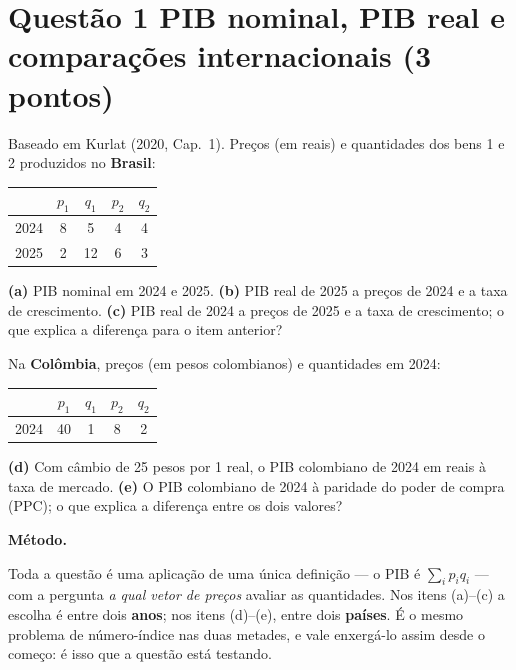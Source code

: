 \documentclass[11pt, a4paper]{article}
\newcommand{\passo}[1]{\medskip\noindent\textbf{#1}\par\nobreak}
\begin{document}
\section[Questão 1 --- PIB nominal, PIB real e comparações internacionais]{Questão 1 \quad PIB nominal, PIB real e comparações internacionais \hfill \normalsize (3 pontos)}

\begin{tcolorbox}[questionbox]
\small
Baseado em Kurlat (2020, Cap.\ 1). Preços (em reais) e quantidades dos bens 1 e 2
produzidos no \textbf{Brasil}:

\begin{center}
\begin{tabular}{ccccc}
\toprule
 & $p_1$ & $q_1$ & $p_2$ & $q_2$ \\
\midrule
2024 & 8 & 5  & 4 & 4 \\
2025 & 2 & 12 & 6 & 3 \\
\bottomrule
\end{tabular}
\end{center}

\textbf{(a)} PIB nominal em 2024 e 2025. \textbf{(b)} PIB real de 2025 a preços de 2024 e a
taxa de crescimento. \textbf{(c)} PIB real de 2024 a preços de 2025 e a taxa de crescimento;
o que explica a diferença para o item anterior?

Na \textbf{Colômbia}, preços (em pesos colombianos) e quantidades em 2024:

\begin{center}
\begin{tabular}{ccccc}
\toprule
 & $p_1$ & $q_1$ & $p_2$ & $q_2$ \\
\midrule
2024 & 40 & 1 & 8 & 2 \\
\bottomrule
\end{tabular}
\end{center}

\textbf{(d)} Com câmbio de 25 pesos por 1 real, o PIB colombiano de 2024 em reais à taxa de
mercado. \textbf{(e)} O PIB colombiano de 2024 à paridade do poder de compra (PPC); o que
explica a diferença entre os dois valores?
\end{tcolorbox}

\passo{Método.} Toda a questão é uma aplicação de uma única definição --- o PIB é
$\sum_i p_i q_i$ --- com a pergunta \emph{a qual vetor de preços} avaliar as quantidades.
Nos itens (a)--(c) a escolha é entre dois \textbf{anos}; nos itens (d)--(e), entre dois
\textbf{países}. É o mesmo problema de número-índice nas duas metades, e vale enxergá-lo
assim desde o começo: é isso que a questão está testando.
\end{document}
